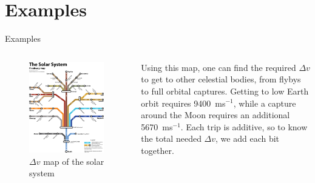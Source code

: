 \documentclass{beamer}
\begin{document}
\section{Examples}
\begin{frame}{Examples}
    \begin{columns}
        \begin{figure}
            \centering
            \includegraphics[width=\textwidth]{AAGJvD1.png}
            \caption{$\Delta v$ map of the solar system}
            \label{fig:my_label}
        \end{figure}
        Using this map, one can find the required $\Delta v$ to get to other celestial bodies, from flybys to full orbital captures. Getting to low Earth orbit requires 9400~ms$^{-1}$, while a capture around the Moon requires an additional 5670~ms$^{-1}$. Each trip is additive, so to know the total needed $\Delta v$, we add each bit together. 
    \end{columns}   
\end{frame}
\end{document}
